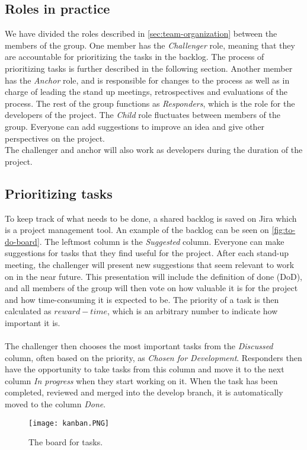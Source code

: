 \subsection{Roles in practice}
We have divided the roles described in \autoref{sec:team-organization} between the members of the group.
One member has the \textit{Challenger} role, meaning that they are accountable for prioritizing the tasks in the backlog.
The process of prioritizing tasks is further described in the following section.
Another member has the \textit{Anchor} role, and is responsible for changes to the process as well as in charge of leading the stand up meetings, retrospectives and evaluations of the process.
The rest of the group functions as \textit{Responders}, which is the role for the developers of the project.
The \textit{Child} role fluctuates between members of the group.
Everyone can add suggestions to improve an idea and give other perspectives on the project. \\
The challenger and anchor will also work as developers during the duration of the project.

\subsection{Prioritizing tasks}
To keep track of what needs to be done, a shared backlog is saved on Jira which is a project management tool.
An example of the backlog can be seen on \autoref{fig:to-do-board}.
The leftmost column is the \textit{Suggested} column.
Everyone can make suggestions for tasks that they find useful for the project.
After each stand-up meeting, the challenger will present new suggestions that seem relevant to work on in the near future.
This presentation will include the definition of done (DoD), and all members of the group will then vote on how valuable it is for the project and how time-consuming it is expected to be.
The priority of a task is then calculated as $reward - time$, which is an arbitrary number to indicate how important it is.
\\\\
The challenger then chooses the most important tasks from the \textit{Discussed} column, often based on the priority, as \textit{Chosen for Development}.
Responders then have the opportunity to take tasks from this column and move it to the next column \textit{In progress} when they start working on it.
When the task has been completed, reviewed and merged into the develop branch, it is automatically moved to the column \textit{Done}.
\begin{figure}[H]
    \centering
    \texttt{[image: kanban.PNG]}
    \caption{The board for tasks.}
    \label{fig:to-do-board}
\end{figure}

